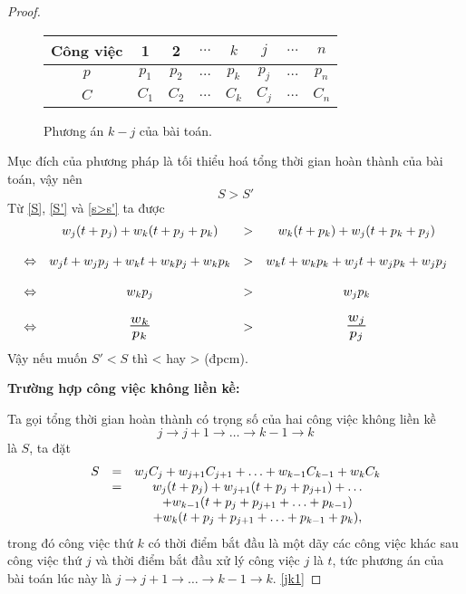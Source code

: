 \documentclass[12pt,a4paper]{report}
\begin{document}
\begin{proof}
	\begin{figure}[h!]
		\centering
		 \begin{tabular}{|c | c c c c c c c |} 
		 \hline
		 Công việc & 1 & 2 & $\ldots$ & $k$ & $j$ & $\ldots$ & $n$ \\
		 \hline\hline
		 $p$ & $p_1$ & $p_2$ & $\ldots$ & $p_k$ & $p_j$ & $\ldots$ & $p_n$ \\
		 $C$ & $C_1$ & $C_2$ & $\ldots$ & $C_k$ & $C_j$ & $\ldots$ & $C_n$ \\
		 \hline
		 \end{tabular}
	\caption{Phương án $k - j$ của bài toán.}
	\end{figure}

	Mục đích của phương pháp là tối thiểu hoá tổng thời gian hoàn thành của bài toán, vậy nên
	\begin{equation} \label{s>s'}
		S > S'
	\end{equation}
	Từ \eqref{S}, \eqref{S'} và \eqref{s>s'} ta được
        \begin{equation*}
        \begin{array}{c c c c}
		& w_j(t+p_j) + w_k(t+p_j+p_k) &>& w_k(t+p_k) + w_j(t+p_k+p_j) \\
		\\
		\Leftrightarrow & w_jt + w_jp_j + w_kt + w_k p_j + w_kp_k &>& w_k t + w_k p_k + w_j t + w_j p_k + w_j p_j \\
		\\
		\Leftrightarrow & w_k p_j &>& w_j p_k \\
		\\
		\Leftrightarrow & \scalebox{1.5}{$\frac{w_k}{p_k}$} &>& \scalebox{1.5}{$\frac{w_j}{p_j}$} \\
        \end{array}
        \end{equation*}
		Vậy nếu muốn $S'<S$ thì  <  hay  >  (đpcm).

\phantom{text}

\textbf{Trường hợp công việc không liền kề:}

	Ta gọi tổng thời gian hoàn thành có trọng số của hai công việc không liền kề $$j \rightarrow j+1 \rightarrow \ldots \rightarrow k-1 \rightarrow k$$ là $S$, ta đặt
	\begin{equation} \label{kolienke1}
		\begin{array}{c c c}
		S &=& w_j C_j + w_{j+1} C_{j+1} + \ldots + w_{k-1} C_{k-1} + w_k C_k \\
		&=& w_j(t+p_j) + w_{j+1} (t + p_j + p_{j+1}) + \ldots \\
		&& + w_{k-1}(t + p_j  + p_{j+1} + \ldots +p_{k-1}) \\
		&& + w_k(t + p_j + p_{j+1} + \ldots +p_{k-1} + p_k),
		\end{array}
	\end{equation}
	trong đó công việc thứ $k$ có thời điểm bắt đầu là một dãy các công việc khác sau công việc thứ $j$ và thời điểm bắt đầu xử lý công việc $j$ là $t$, tức phương án của bài toán lúc này là $j \rightarrow j+1 \rightarrow \ldots \rightarrow k-1 \rightarrow k$. \eqref{jk1}
	

\end{proof}
\end{document}
